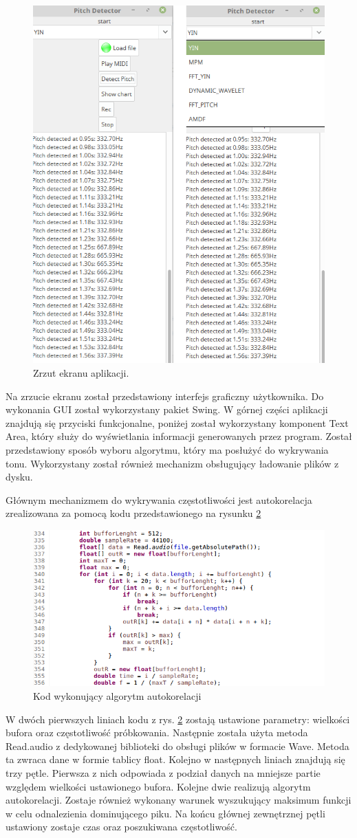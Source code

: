 \begin{figure}[h!]
  \centering
  \includegraphics[width=0.5\linewidth]{rys/zrzut1}
  \caption{Zrzut ekranu aplikacji.}
  \label{app}
\end{figure}


Na zrzucie ekranu został przedstawiony interfejs graficzny użytkownika. Do wykonania GUI został wykorzystany pakiet Swing. W górnej części aplikacji znajdują się przyciski funkcjonalne, poniżej został wykorzystany komponent Text Area, który służy do wyświetlania informacji generowanych przez program. Został przedstawiony sposób wyboru algorytmu, który ma posłużyć do wykrywania tonu. Wykorzystany został również mechanizm obsługujący ładowanie plików z dysku.

Głównym mechanizmem do wykrywania częstotliwości jest autokorelacja zrealizowana za pomocą kodu przedstawionego na rysunku \ref{kod1}

\begin{figure}[h!]
  \centering
  \includegraphics[width=0.9\linewidth]{rys/kod1}
  \caption{Kod wykonujący algorytm autokorelacji}
  \label{kod1}
\end{figure}
W dwóch pierwszych liniach kodu z rys. \ref{kod1} zostają ustawione parametry: wielkości bufora oraz częstotliwość próbkowania. Następnie została użyta metoda Read.audio z dedykowanej biblioteki do obsługi plików w formacie Wave. Metoda ta zwraca dane w formie tablicy float. Kolejno w następnych liniach znajdują się trzy pętle. Pierwsza z nich odpowiada z podział danych na mniejsze partie względem wielkości ustawionego bufora. Kolejne dwie realizują algorytm autokorelacji. Zostaje również wykonany warunek wyszukujący maksimum funkcji w celu odnalezienia dominującego piku. Na końcu głównej zewnętrznej pętli ustawiony zostaje czas oraz poszukiwana częstotliwość.

